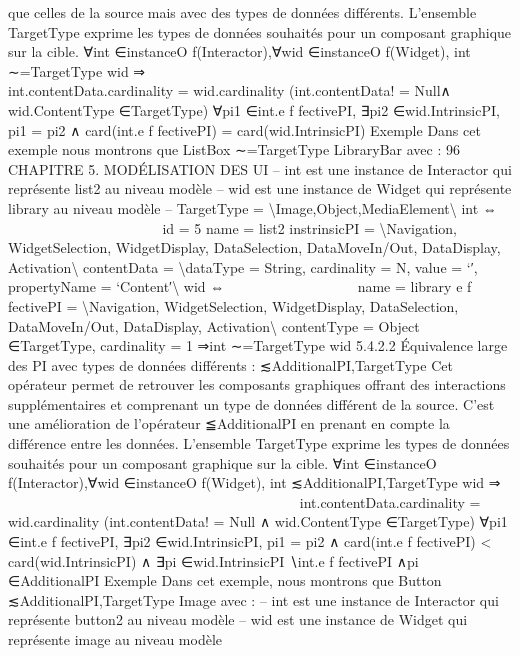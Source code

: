 \documentclass{article}
\begin{document}
que celles de la source mais avec des types de donn\'{e}es diff\'{e}rents. L’ensemble TargetType exprime
les types de donn\'{e}es souhait\'{e}s pour un composant graphique sur la cible.
∀int ∈instanceO f(Interactor),∀wid ∈instanceO f(Widget),
int ∼=TargetType wid ⇒























int.contentData.cardinality = wid.cardinality
(int.contentData! = Null∧
wid.ContentType ∈TargetType)
∀pi1 ∈int.e f fectivePI,
∃pi2 ∈wid.IntrinsicPI,
pi1 = pi2
∧
card(int.e f fectivePI) = card(wid.IntrinsicPI)
Exemple
Dans cet exemple nous montrons que ListBox ∼=TargetType LibraryBar avec :
96
CHAPITRE 5. MODÉLISATION DES UI
– int est une instance de Interactor qui repr\'{e}sente list2 au niveau mod\`{e}le
– wid est une instance de Widget qui repr\'{e}sente library au niveau mod\`{e}le
– TargetType = \textbackslash{}{Image,Object,MediaElement\textbackslash{}}
int ⇔



















id = 5
name = list2
instrinsicPI = \textbackslash{}{Navigation, WidgetSelection,
WidgetDisplay, DataSelection, DataMoveIn/Out,
DataDisplay, Activation\textbackslash{}}
contentData = \textbackslash{}{dataType = String, cardinality = N,
value = ‘′, propertyName = ‘Content′\textbackslash{}}
wid ⇔















name = library
e f fectivePI = \textbackslash{}{Navigation, WidgetSelection,
WidgetDisplay, DataSelection, DataMoveIn/Out,
DataDisplay, Activation\textbackslash{}}
contentType = Object ∈TargetType,
cardinality = 1
⇒int ∼=TargetType wid
5.4.2.2
Équivalence large des PI avec types de donn\'{e}es diff\'{e}rents : ≲AdditionalPI,TargetType
Cet op\'{e}rateur permet de retrouver les composants graphiques offrant des interactions suppl\'{e}mentaires et comprenant un type de donn\'{e}es diff\'{e}rent de la source. C’est une am\'{e}lioration de l’op\'{e}rateur
≦AdditionalPI en prenant en compte la diff\'{e}rence entre les donn\'{e}es. L’ensemble TargetType exprime
les types de donn\'{e}es souhait\'{e}s pour un composant graphique sur la cible.
∀int ∈instanceO f(Interactor),∀wid ∈instanceO f(Widget),
int ≲AdditionalPI,TargetType wid ⇒



































int.contentData.cardinality = wid.cardinality
(int.contentData! = Null
∧
wid.ContentType ∈TargetType)
∀pi1 ∈int.e f fectivePI,
∃pi2 ∈wid.IntrinsicPI,
pi1 = pi2
∧
card(int.e f fectivePI) < card(wid.IntrinsicPI)
∧
∃pi ∈wid.IntrinsicPI ∖int.e f fectivePI ∧pi ∈AdditionalPI
Exemple
Dans cet exemple, nous montrons que Button ≲AdditionalPI,TargetType Image avec :
– int est une instance de Interactor qui repr\'{e}sente button2 au niveau mod\`{e}le
– wid est une instance de Widget qui repr\'{e}sente image au niveau mod\`{e}le
\end{document}
